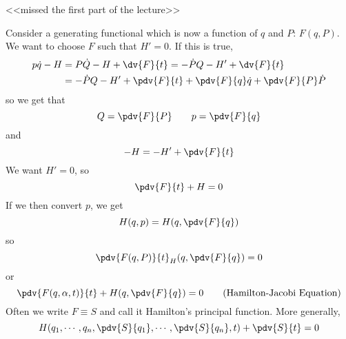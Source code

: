 \documentclass[a4paper,twoside,master.tex]{subfiles}
\begin{document}
<<missed the first part of the lecture>>

Consider a generating functional which is now a function of $ q $ and $ P $: $ F(q,P) $. We want to choose $ F $ such that $ H' = 0 $. If this is true,
\begin{align}
    p\dot{q} - H &= P\dot{Q} - H + \dv{F}{t} = - \dot{P}Q-H' + \dv{F}{t} \\
    &= - \dot{P}Q-H' + \pdv{F}{t} + \pdv{F}{q}\dot{q} + \pdv{F}{P}\dot{P}
\end{align}
so we get that
\begin{equation}
    Q = \pdv{F}{P} \qquad p = \pdv{F}{q}
\end{equation}
and
\begin{equation}
    -H = -H' + \pdv{F}{t}
\end{equation}
We want $ H' = 0 $, so
\begin{equation}
    \pdv{F}{t} + H = 0
\end{equation}
If we then convert $ p $, we get
\begin{equation}
    H(q,p) = H(q, \pdv{F}{q})
\end{equation}
so
\begin{equation}
    \pdv{F(q,P)}{t} _ H(q, \pdv{F}{q}) = 0
\end{equation}
or
\begin{equation}\label{eq:hamilton_jacobi}
    \pdv{F(q, \alpha, t)}{t} + H(q, \pdv{F}{q}) = 0\tag{Hamilton-Jacobi Equation}
\end{equation}
Often we write $ F \equiv S $ and call it Hamilton's principal function. More generally,
\begin{equation}
    H(q_1,\cdots,q_n, \pdv{S}{q_1},\cdots, \pdv{S}{q_n}, t) + \pdv{S}{t} = 0
\end{equation}
\end{document}
